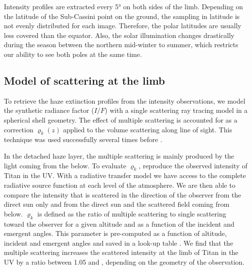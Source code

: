 Intensity profiles are extracted every \ang{5} on both sides of the limb. Depending on the
latitude of the Sub-Cassini point on the ground, the sampling in latitude is not evenly distributed for each image.
Therefore, the polar latitudes are usually less covered than the equator.
Also, the solar illumination changes drastically during the
season between the northern mid-winter to summer, which restricts our ability to see both poles at the same time.


\subsection{Model of scattering at the limb}

To retrieve the haze extinction profiles from the intensity observations, we model the synthetic
radiance factor ($I/F$) with a single scattering ray tracing model in a spherical shell geometry.
The effect of multiple scattering is accounted for as a correction $\varrho_k (z)$
applied to the volume scattering along line of sight.
This technique was used successfully several times before \citep[\eg][]{Rages1983, Rannou1997, Seignovert2017, West2018}.

In the detached haze layer, the multiple scattering is mainly produced by the light coming from the  below. To
evaluate $\varrho_k$, 
reproduce the observed intensity of Titan in the UV. With a radiative transfer model \citep[SHDOMPP, from ][]{Evans1998}
we have access to the complete radiative source function at each level of the atmosphere. We are then able to compare the
intensity that is scattered in the direction of the observer from the direct sun only and from the direct sun and the scattered
field coming from below. $\varrho_k$ is defined as the ratio of multiple scattering to single scattering toward the observer
for a given altitude and as a function of the incident and emergent angles. This parameter is pre-computed as a function of
altitude, incident and emergent angles and saved in a look-up table \citep[see.][for details]{West2018}.
We find that the multiple scattering increases the scattered intensity at the limb of Titan in the UV by a ratio between
1.05 and , depending on the geometry of the observation.

